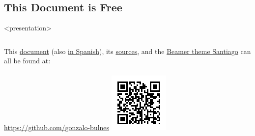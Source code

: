 %
\subsection{This Document is Free}


  \begin{frame}<presentation>{\insertsubsection}

    \footnotesize
      \begin{columns}
          This \href{https://github.com/gonzalo-bulnes/you-dont-know-everything/raw/master/YDNE.pdf}{document} (also \href{https://github.com/gonzalo-bulnes/you-dont-know-everything/raw/master/YDNE-es.pdf}{in Spanish}), its \href{https://github.com/gonzalo-bulnes/you-dont-know-everything}{sources}, and the \href{https://github.com/gonzalo-bulnes/santiago-beamer-theme}{Beamer theme Santiago} can all be found at:\\~\\
          \url{https://github.com/gonzalo-bulnes}
        \hfill\includegraphics[width=\textwidth]{../images/sources-talk.png}
      \end{columns}
    \normalsize


\end{frame}
